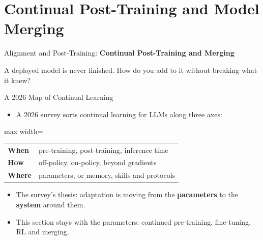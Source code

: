 \section{Continual Post-Training and Model Merging}

\begin{frame}{}
    \LARGE Alignment and Post-Training: \textbf{Continual Post-Training and Merging}

    \vspace{1em}
    \normalsize A deployed model is never finished. How do you add to it without breaking what it knew?
\end{frame}

\begin{frame}{A 2026 Map of Continual Learning}
    \begin{itemize}\itemsep0.4em
        \item A 2026 survey sorts continual learning for LLMs along three axes:
    \end{itemize}
    \begin{center}
    \small
    \renewcommand{\arraystretch}{1.3}
    \begin{adjustbox}{max width=\linewidth}\begin{tabular}{l>{\raggedright\arraybackslash}p{7.6cm}}
        \toprule
        \textbf{When} & pre-training, post-training, inference time \\
        \textbf{How} & off-policy, on-policy, beyond gradients \\
        \textbf{Where} & parameters, or memory, skills and protocols \\
        \bottomrule
    \end{tabular}\end{adjustbox}
    \end{center}
    \vspace{0.4em}
    \begin{itemize}\itemsep0.4em
        \item The survey's thesis: adaptation is moving from the \textbf{parameters} to the \textbf{system} around them.
        \item This section stays with the parameters: continued pre-training, fine-tuning, RL and merging.
    \end{itemize}
\end{frame}

